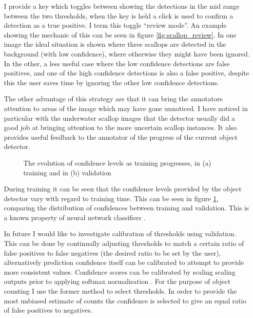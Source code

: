 I provide a key which toggles between showing the detections in the mid range between the two thresholds, when the key is held a click is used to confirm a detection as a true positive. I term this toggle ``review mode''.  An example showing the mechanic of this can be seen in figure \ref{fig:scallop_review}. In one image the ideal situation is shown where three scallops are detected in the background (with low confidence), where otherwise they might have been ignored. In the other, a less useful case where the low confidence detections are false positives, and one of the high confidence detections is also a false positive, despite this the user saves time by ignoring the other low confidence detections.

The other advantage of this strategy are that it can bring the annotators attention to areas of the image which may have gone unnoticed. I have noticed in particular with the underwater scallop images that the detector usually did a good job at bringing attention to the more uncertain scallop instances. It also provides useful feedback to the annotator of the progress of the current object detector. 




\begin{figure}[h]
\centering


\caption{ The evolution of confidence levels as training progresses, in (a) training and in (b) validation }
\label {fig:confidence}
\end{figure}

During training it can be seen that the confidence levels provided by the object detector vary with regard to training time. This can be seen in figure \ref{fig:confidence}, comparing the distribution of confidences between training and validation. This is a known property of neural network classifiers \cite{Guo2017}.

In future I would like to investigate calibration of thresholds using validation. This can be done by continually adjusting thresholds to match a certain ratio of false positives to false negatives (the desired ratio to be set by the user), alternatively prediction confidence itself can be calibrated to attempt to provide more consistent values. Confidence scores can be calibrated by scaling scaling outputs prior to applying softmax normalisation \cite{Guo2017}. For the purpose of object counting I use the former method to select thresholds. In order to provide the most unbiased estimate of counts the confidence is selected to give an equal ratio of false positives to negatives.
 

